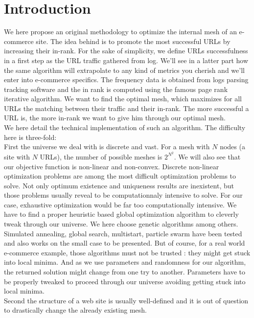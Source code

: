\documentclass{iSWAGArticle}
\begin{document}
\section{Introduction}
We here propose an original methodology to optimize the internal mesh of an e-commerce site.
The idea behind is to promote the most successful URLs by increasing their in-rank.  
For the sake of simplicity, we define URLs successfulness in a first step as the URL traffic gathered from log.
We'll see in a latter part how the same algorithm will extrapolate to any kind of metrics you cherish and we'll enter into e-commerce specifics.
The frequency data is obtained from logs parsing tracking software and the in rank is computed using the famous page rank iterative algorithm.  
We want to find the optimal mesh, which maximizes for all URLs the matching between their traffic and their in-rank. 
The more successful a URL is, the more in-rank we want to give him through our optimal mesh.
 \\\newline
We here detail the technical implementation of such an algorithm.
The difficulty here is three-fold:
\\
\indent
First the universe we deal with is discrete and vast. For a mesh with $N$ nodes (a site with $N$ URLs), the number of possible meshes is $2^{N^{2}}$. 
We will also see that our objective function is non-linear and non-convex.  Discrete non-linear optimization problems are among the most difficult optimization problems to solve. 
Not only optimum existence and uniqueness results are inexistent, but those problems usually reveal to be computationnaly intensive to solve. 
For our case, exhaustive optimization would be far too computationally intensive. We have to find a proper heuristic based global optimization algorithm to cleverly tweak through our universe.
We here choose genetic algorithms among others. Simulated annealing, global search, multistart, particle swarm have been tested and also works on the small case to be presented.
But of course, for a real world e-commerce example, those algorithms must not be trusted : they might get stuck into local minima. 
And as we use parameters and randomness for our algorithm, the returned solution might change from one try to another. 
Parameters have to be properly tweaked to proceed through our universe avoiding getting stuck into local minima.
\\
\indent
Second the structure of a web site is usually well-defined and it is out of question to drastically change the already existing mesh.
\end{document}
